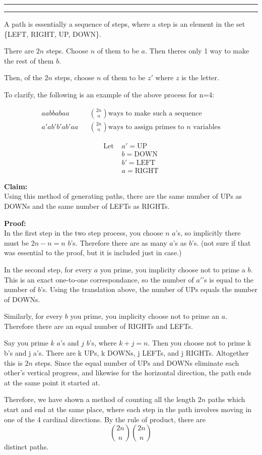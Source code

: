\documentclass[11pt]{article}
\newcounter{questionCounter}
\newcounter{partCounter}[questionCounter]
\newenvironment{question}[2][\arabic{questionCounter}]{%
    \setcounter{partCounter}{0}%
    \vspace{.25in} \hrule \vspace{0.5em}%
        \noindent{\bf #2}%
    \vspace{0.8em} \hrule \vspace{.10in}%
    \addtocounter{questionCounter}{1}%
}{}
\begin{document}
\begin{question}{Mirror, Mirror On The Wall}
A path is essentially a sequence of steps, where a step is an element in the set 
\{LEFT, RIGHT, UP, DOWN\}.

There are $2n$ steps. Choose $n$ of them to be $a$. Then theres only 1 way to make
the rest of them $b$.

Then, of the $2n$ steps, choose $n$ of them to be $z'$ where $z$ is the letter. 

To clarify, the following is an example of the above process for n=4:

\begin{align}
aabbabaa && \binom{2n}{n} \mbox{ways to make such a sequence}\\
a'ab'b'ab'aa && \binom{2n}{n} \mbox{ways to assign primes to $n$ variables}
\end{align}

\begin{align*}
\mbox{Let } & a' = \mbox{UP}\\
            & b  = \mbox{DOWN}\\
            & b'  = \mbox{LEFT}\\
            & a  = \mbox{RIGHT}
\end{align*}

\textbf{Claim:}\\
Using this method of generating paths, there are the same number of UPs as DOWNs
and the same number of LEFTs as RIGHTs.

\textbf{Proof:}\\
In the first step in the two step process, you choose $n$ $a$'s, so implicitly 
there must be $2n-n=n$ $b$'s. Therefore there are as many $a$'s as $b$'s. (not 
sure if that was essential to the proof, but it is included just in case.)

In the second step, for every $a$ you prime, you implicity choose not to prime a $b$. 
This is an exact one-to-one correspondance, so the number of $a'$'s is equal
to the number of $b$'s. Using the translation above, the number of UPs equals 
the number of DOWNs.

Similarly, for every $b$ you prime, you implicity choose not to prime an $a$. 
Therefore there are an equal number of RIGHTs and LEFTs.

Say you prime $k$ $a$'s and $j$ $b$'s, where $k + j = n$. Then you choose not to prime 
k b's and j a's. There are k UPs, k DOWNs, j LEFTs, and j RIGHTs. Altogether
this is $2n$ steps. Since the equal number of UPs and DOWNs eliminate each 
other's vertical progress, and likewise for the horizontal direction, the path
ends at the same point it started at.

Therefore, we have shown a method of counting all the length $2n$ paths which
start and end at the same place, where each step in the path involves moving in
one of the 4 cardinal directions. By the rule of product, there are 
$$ \binom{2n}{n}\binom{2n}{n} $$
distinct paths.

\end{question}
\end{document}
